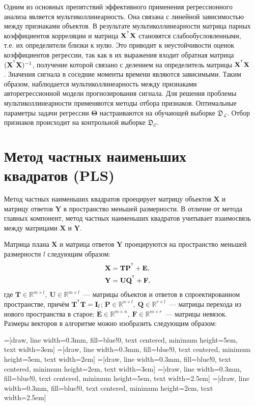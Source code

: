 \documentclass[12pt,twoside]{article}
\newcommand{\bY}{\mathbf{Y}}
\newcommand{\bX}{\mathbf{X}}
\newcommand{\bP}{\mathbf{P}}
\newcommand{\bT}{\mathbf{T}}
\newcommand{\bQ}{\mathbf{Q}}
\newcommand{\bE}{\mathbf{E}}
\newcommand{\bF}{\mathbf{F}}
\newcommand{\bU}{\mathbf{U}}
\newcommand{\bI}{\mathbf{I}}
\newcommand{\bTheta}{\boldsymbol{\Theta}}
\begin{document}
Одним из основных препятствий эффективного применения регрессионного анализа является мультиколлинеарность. Она связана с линейной зависимостью между признаками объектов. В результате мультиколлинеарности матрица парных коэффициентов корреляции и матрица $\bX^{\T} \bX$ становятся слабообусловленными, т.е. их определители близки к нулю. Это приводит к неустойчивости оценок коэффициентов регрессии, так как в их выражения входит обратная матрица $(\bX^{\T}\bX)^{-1}$, получение которой связано с делением на определитель матрицы $\bX^{\T}\bX$. 
Значения сигнала в соседние моменты времени являются зависимыми.
Таким образом, наблюдается мультиколлинеарность между признаками авторегрессионной модели прогнозирования сигнала. 
Для решения проблемы мультиколлинеарности применяются методы отбора признаков. Оптимальные параметры задачи регрессии $\bTheta$ настраиваются на обучающей выборке $\mathfrak{D}_\mathcal{L}$. 
Отбор признаков происходит на контрольной выборке $\mathfrak{D}_\mathcal{C}$. 

\section{Метод частных наименьших квадратов (PLS)}

Метод частных наименьших квадратов проецирует матрицу объектов $\bX$ и матрицу ответов $\bY$ в пространство меньшей размерности. В отличие от метода главных компонент, метод частных наименьших квадратов учитывает взаимосвязь между матрицами $\bX$ и $\bY$.

Матрица плана $\bX$ и матрица ответов $\bY$ проецируются на пространство меньшей размерности $l$ следующим образом:
\begin{align}
\label{pls_x_y}
    \bX &= \bT \bP^{\T} + \bE,\\
    \bY &= \bU \bQ^{\T} + \bF,
\end{align}
где $\bT \in \mathbb{R}^{m \times l},\ \bU \in \mathbb{R}^{m \times l}$~--- матрицы объектов и ответов в спроектированном пространстве, причём $\bT^{\T} \bT = \bI_{l}$; $\bP \in \mathbb{R}^{n \times l},\ \bQ \in \mathbb{R}^{r \times l}$~--- матрицы перехода из нового пространства в старое; $\bE\in \mathbb{R}^{m \times n},\ \bF \in \mathbb{R}^{m \times r}$~--- матрицы невязок. Размеры векторов в алгоритме можно изобразить следующим образом:

=[draw, line width=0.3mm, fill=blue!0, text centered, minimum height=5em, text width=3em]
=[draw, line width=0.3mm, fill=blue!0, text centered, minimum height=5em, text width=2em]
=[draw, line width=0.3mm, fill=blue!0, text centered, minimum height=2em, text width=3em]
=[draw, line width=0.3mm, fill=blue!0, text centered, minimum height=5em, text width=2.5em]
=[draw, line width=0.3mm, fill=blue!0, text centered, minimum height=2em, text width=2.5em]
\end{document}

